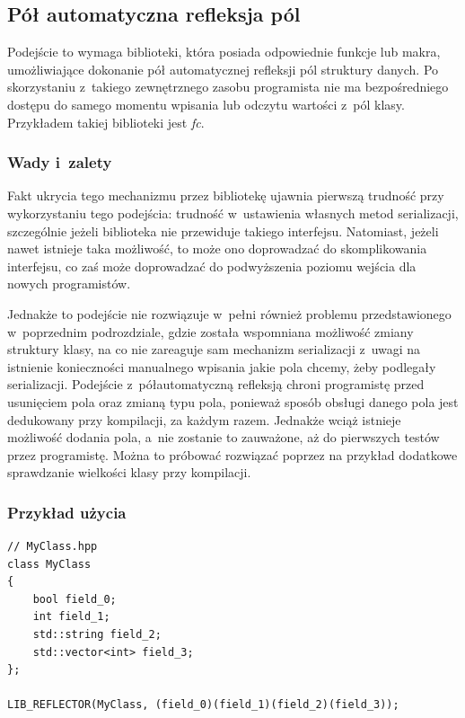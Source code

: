 \documentclass[12pt]{article}
\newcommand{\n}{\newline}
\newcommand{\nonpl}[1]{{\it #1}}
\begin{document}
{		{
			\subsection{Pół automatyczna refleksja pól}

			Podejście to wymaga biblioteki, która posiada odpowiednie funkcje lub makra, umożliwiające dokonanie pół automatycznej
			refleksji pól struktury danych. Po skorzystaniu z~takiego zewnętrznego zasobu programista nie ma bezpośredniego dostępu do samego momentu
			wpisania lub odczytu wartości z~pól klasy. Przykładem takiej biblioteki jest \nonpl{fc}\cite{fc_repo}.\n

			{
				\subsubsection{Wady i~zalety}

				Fakt ukrycia tego mechanizmu przez bibliotekę ujawnia pierwszą trudność przy wykorzystaniu tego podejścia: trudność w~ustawienia własnych
				metod serializacji, szczególnie jeżeli biblioteka nie przewiduje takiego interfejsu. Natomiast, jeżeli nawet istnieje taka możliwość,
				to może ono doprowadzać do skomplikowania interfejsu, co zaś może doprowadzać do podwyższenia poziomu wejścia dla nowych programistów.

				Jednakże to podejście nie rozwiązuje w~pełni również problemu przedstawionego w~poprzednim podrozdziale, gdzie została wspomniana
				możliwość zmiany struktury klasy, na co nie zareaguje sam mechanizm serializacji z~uwagi na istnienie
				konieczności manualnego wpisania jakie pola chcemy, żeby podlegały serializacji. Podejście z~półautomatyczną refleksją
				chroni programistę przed usunięciem pola oraz zmianą typu pola, ponieważ sposób obsługi danego pola jest dedukowany przy
				kompilacji, za każdym razem. Jednakże wciąż istnieje możliwość dodania pola, a~nie zostanie to zauważone, aż do pierwszych testów
				przez programistę. Można to próbować rozwiązać poprzez na przykład dodatkowe sprawdzanie wielkości klasy przy kompilacji.
			}

			{
				\subsubsection{Przykład użycia}
				\begin{lstlisting}[frame=single]
// MyClass.hpp
class MyClass
{
	bool field_0;
	int field_1;
	std::string field_2;
	std::vector<int> field_3;
};

LIB_REFLECTOR(MyClass, (field_0)(field_1)(field_2)(field_3));


\end{lstlisting}}}}
\end{document}
